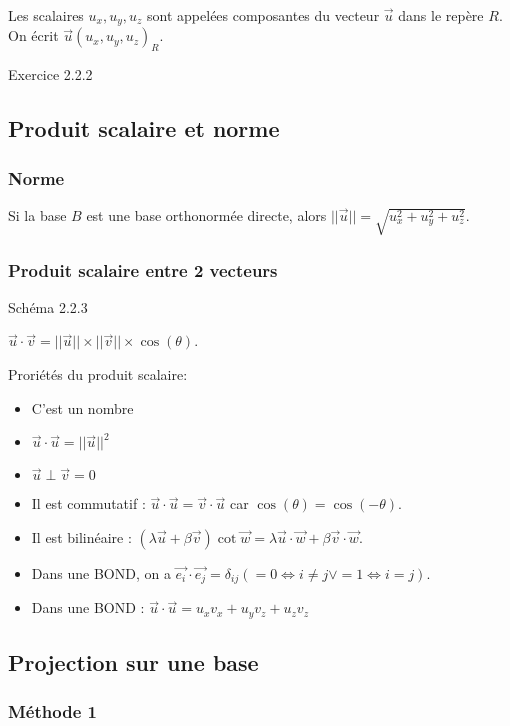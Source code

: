 \documentclass[french]{yLectureNote}
\renewcommand{\vec}{\overrightarrow}
\begin{document}
Les scalaires $u_x,u_y,u_z$ sont appelées composantes du vecteur $\vec{u}$ dans le repère $R$. On écrit $\vec{u} (u_x,u_y,u_z)_R$.

Exercice 2.2.2

\subsection{Produit scalaire et norme}
\subsubsection{Norme}
Si la base $B$ est une base orthonormée directe, alors $||\vec{u}|| = \sqrt{u_x^2+u_y^2+u_z^2}$.
\subsubsection{Produit scalaire entre 2 vecteurs}

Schéma 2.2.3

\begin{theorem}[Définition]
$\vec{u}\cdot\vec{v} = ||\vec{u}||\times||\vec{v}|| \times \cos(\theta)$.
\end{theorem}
Proriétés du produit scalaire:

\begin{itemize}
 \item C'est un nombre
 \item $\vec{u}\cdot\vec{u} = ||\vec{u}||^2$
 \item $ \vec{u} \perp  \vec{v} = 0$
 \item Il est commutatif : $\vec{u}\cdot\vec{u} = \vec{v}\cdot\vec{u}$ car $\cos(\theta) = \cos(-\theta)$.
 \item Il est bilinéaire : $(\lambda \vec{u}+\beta \vec{v})\cot \vec{w} = \lambda \vec{u}\cdot \vec{w} + \beta \vec{v}\cdot \vec{w}$.
 \item Dans une BOND, on a $\vec{e_i}\cdot\vec{e_j} = \delta_{ij} (= 0 \iff i\neq j \vee = 1 \iff i=j)$.
 \item Dans une BOND : $\vec{u}\cdot\vec{u} = u_xv_x + u_yv_z+u_zv_z$
\end{itemize}
\subsection{Projection sur une base}
\subsubsection{Méthode 1}
\end{document}
